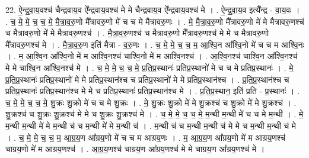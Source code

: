 \documentclass[17pt]{extarticle}
\begin{document}
22. ऐ॒न्द्र॒वा॒य॒वश्च॑ चैन्द्रवाय॒व ऐ᳚न्द्रवाय॒वश्च॑ मे मे चैन्द्रवाय॒व ऐ᳚न्द्रवाय॒वश्च॑ मे । . ऐ॒न्द्र॒वा॒य॒व इत्यै᳚न्द्र - वा॒य॒वः । . च॒ मे॒ मे॒ च॒ च॒ मे॒ मै॒त्रा॒व॒रु॒णो मै᳚त्रावरु॒णो मे॑ च च मे मैत्रावरु॒णः । . मे॒ मै॒त्रा॒व॒रु॒णो मै᳚त्रावरु॒णो मे॑ मे मैत्रावरु॒णश्च॑ च मैत्रावरु॒णो मे॑ मे मैत्रावरु॒णश्च॑ । . मै॒त्रा॒व॒रु॒णश्च॑ च मैत्रावरु॒णो मै᳚त्रावरु॒णश्च॑ मे मे च मैत्रावरु॒णो मै᳚त्रावरु॒णश्च॑ मे । . मै॒त्रा॒व॒रु॒ण इति॑ मैत्रा - व॒रु॒णः । . च॒ मे॒ मे॒ च॒ च॒ म॒ आ॒श्वि॒न आ᳚श्वि॒नो मे॑ च च म आश्वि॒नः । . म॒ आ॒श्वि॒न आ᳚श्वि॒नो मे॑ म आश्वि॒नश्च॑ चाश्वि॒नो मे॑ म आश्वि॒नश्च॑ । . आ॒श्वि॒नश्च॑ चाश्वि॒न आ᳚श्वि॒नश्च॑ मे मे चाश्वि॒न आ᳚श्वि॒नश्च॑ मे । . च॒ मे॒ मे॒ च॒ च॒ मे॒ प्र॒ति॒प्र॒स्थानः॑ प्रतिप्र॒स्थानो॑ मे च च मे प्रतिप्र॒स्थानः॑ । . मे॒ प्र॒ति॒प्र॒स्थानः॑ प्रतिप्र॒स्थानो॑ मे मे प्रतिप्र॒स्थान॑श्च च प्रतिप्र॒स्थानो॑ मे मे प्रतिप्र॒स्थान॑श्च । . प्र॒ति॒प्र॒स्थान॑श्च च प्रतिप्र॒स्थानः॑ प्रतिप्र॒स्थान॑श्च मे मे च प्रतिप्र॒स्थानः॑ प्रतिप्र॒स्थान॑श्च मे । . प्र॒ति॒प्र॒स्थान॒ इति॑ प्रति - प्र॒स्थानः॑ । . च॒ मे॒ मे॒ च॒ च॒ मे॒ शु॒क्रः शु॒क्रो मे॑ च च मे शु॒क्रः । . मे॒ शु॒क्रः शु॒क्रो मे॑ मे शु॒क्रश्च॑ च शु॒क्रो मे॑ मे शु॒क्रश्च॑ । . शु॒क्रश्च॑ च शु॒क्रः शु॒क्रश्च॑ मे मे च शु॒क्रः शु॒क्रश्च॑ मे । . च॒ मे॒ मे॒ च॒ च॒ मे॒ म॒न्थी म॒न्थी मे॑ च च मे म॒न्थी । . मे॒ म॒न्थी म॒न्थी मे॑ मे म॒न्थी च॑ च म॒न्थी मे॑ मे म॒न्थी च॑ । . म॒न्थी च॑ च म॒न्थी म॒न्थी च॑ मे मे च म॒न्थी म॒न्थी च॑ मे । . च॒ मे॒ मे॒ च॒ च॒ म॒ आ॒ग्र॒य॒ण आ᳚ग्रय॒णो मे॑ च च म आग्रय॒णः । . म॒ आ॒ग्र॒य॒ण आ᳚ग्रय॒णो मे॑ म आग्रय॒णश्च॑ चाग्रय॒णो मे॑ म आग्रय॒णश्च॑ । . आ॒ग्र॒य॒णश्च॑ चाग्रय॒ण आ᳚ग्रय॒णश्च॑ मे मे चाग्रय॒ण आ᳚ग्रय॒णश्च॑ मे । \newline
\end{document}
